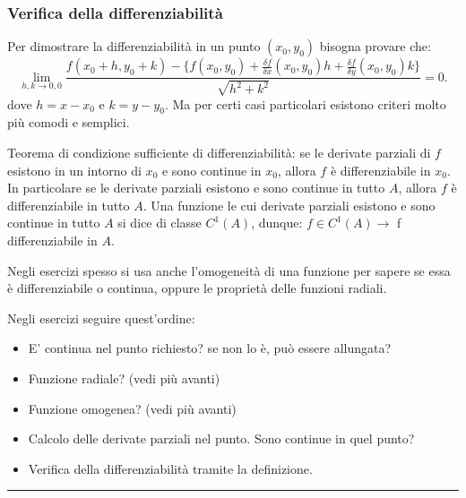\subsubsection*{Verifica della differenziabilità}
Per dimostrare la differenziabilità in un punto $(x_0,y_0)$ bisogna provare che:
\[
    \lim_{h,k\rightarrow 0,0}\frac{f(x_0+h, y_0+k)-\{
        f(x_0,y_0)+ \frac{\delta f}{\delta x}(x_0,y_0) h + \frac{\delta f}{\delta y}(x_0,y_0)k
        \}}{\sqrt{h^2+k^2}} =0.
\]
dove $h = x-x_0$ e $k = y-y_0$.\newline
Ma per certi casi particolari esistono criteri molto più comodi e semplici.

\begin{tcolorbox}
Teorema di condizione sufficiente di differenziabilità: se le derivate parziali di $f$ esistono in un intorno di $x_0$ e sono continue in $x_0$, allora $f$ è differenziabile in $x_0$.\newline
In particolare se le derivate parziali esistono e sono continue in tutto $A$, allora $f$ è differenziabile in tutto $A$.\newline
Una funzione le cui derivate parziali esistono e sono continue in tutto $A$ si dice di classe $C^1(A)$, dunque: $f \in C^1(A) \rightarrow$ f differenziabile in $A$.
\end{tcolorbox}

Negli esercizi spesso si usa anche l'omogeneità di una funzione per sapere se essa è differenziabile o continua, oppure le proprietà delle funzioni radiali.\newline

Negli esercizi seguire quest'ordine:
\begin{tcolorbox}
\begin{itemize}
    \item E' continua nel punto richiesto? se non lo è, può essere allungata?
    \item Funzione radiale? (vedi più avanti)
    \item Funzione omogenea? (vedi più avanti)
    \item Calcolo delle derivate parziali nel punto. Sono continue in quel punto?
    \item Verifica della differenziabilità tramite la definizione.
\end{itemize}
\end{tcolorbox}
\rule{\textwidth}{0.4pt}
